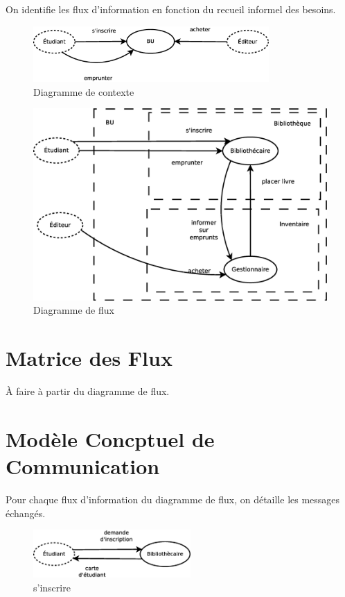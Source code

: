 On identifie les flux d'information en fonction du recueil informel des besoins.

\begin{figure}[!htb]
    \begin{center}
    \includegraphics[width=9cm]{images/cc2_df1.eps}
    \caption{\label{cc2_df1} Diagramme de contexte}
    \end{center}
\end{figure}

\begin{figure}[!htb]
    \begin{center}
    \includegraphics[width=12cm]{images/cc2_df2.eps}
    \caption{\label{cc2_df3} Diagramme de flux}
    \end{center}
\end{figure}

\section*{Matrice des Flux}

À faire à partir du diagramme de flux.

\newpage
\section*{Modèle Concptuel de Communication}

Pour chaque flux d'information du diagramme de flux, on détaille les messages échangés.

\begin{figure}[!htb]
    \begin{center}
    \includegraphics[width=6cm]{images/cc2_mcc1.eps}
    \caption{\label{cc2_mcc1} s'inscrire}
    \end{center}
\end{figure}


